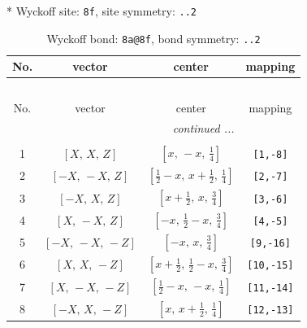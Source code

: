 \documentclass[fleqn,8pt]{jsarticle}
\begin{document}
* Wyckoff site: {\tt 8f}, site symmetry: {\tt ..2}
\renewcommand{\arraystretch}{1.2}
\begin{longtable}{cccc}
\caption{Wyckoff bond: {\tt 8a@8f}, bond symmetry: {\tt ..2}}
 \\
 \hline \hline
No. & vector & center & mapping \\ \hline \endfirsthead

\multicolumn{3}{l}{\tablename\ \thetable{}} \\
 \hline \hline
No. & vector & center & mapping \\ \hline \endhead

 \hline \hline
\multicolumn{3}{r}{\footnotesize\it continued ...} \\ \endfoot

 \hline \hline
\multicolumn{3}{r}{} \\ \endlastfoot

1 & $\left[ X,\, X,\, Z \right]$ & $\left[ x,\, - x,\, \frac{1}{4} \right]$ & {\tt [1,-8]} \\ \hline
2 & $\left[ - X,\, - X,\, Z \right]$ & $\left[ \frac{1}{2} - x,\, x + \frac{1}{2},\, \frac{1}{4} \right]$ & {\tt [2,-7]} \\ \hline
3 & $\left[ - X,\, X,\, Z \right]$ & $\left[ x + \frac{1}{2},\, x,\, \frac{3}{4} \right]$ & {\tt [3,-6]} \\ \hline
4 & $\left[ X,\, - X,\, Z \right]$ & $\left[ - x,\, \frac{1}{2} - x,\, \frac{3}{4} \right]$ & {\tt [4,-5]} \\ \hline
5 & $\left[ - X,\, - X,\, - Z \right]$ & $\left[ - x,\, x,\, \frac{3}{4} \right]$ & {\tt [9,-16]} \\ \hline
6 & $\left[ X,\, X,\, - Z \right]$ & $\left[ x + \frac{1}{2},\, \frac{1}{2} - x,\, \frac{3}{4} \right]$ & {\tt [10,-15]} \\ \hline
7 & $\left[ X,\, - X,\, - Z \right]$ & $\left[ \frac{1}{2} - x,\, - x,\, \frac{1}{4} \right]$ & {\tt [11,-14]} \\ \hline
8 & $\left[ - X,\, X,\, - Z \right]$ & $\left[ x,\, x + \frac{1}{2},\, \frac{1}{4} \right]$ & {\tt [12,-13]} \\
\end{longtable}
\renewcommand{\arraystretch}{1.2}
\end{document}

